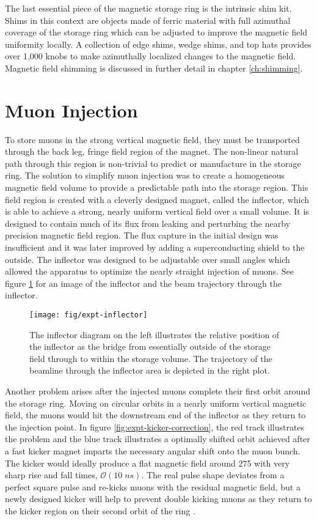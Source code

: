 The last essential piece of the magnetic storage ring is the intrinsic shim kit.  Shims in this context are objects made of ferric material with full azimuthal coverage of the storage ring which can be adjusted to improve the magnetic field uniformity locally. A collection of edge shims, wedge shims, and top hats provides over 1,000 knobs to make azimuthally localized changes to the magnetic field.
Magnetic field shimming is discussed in further detail in chapter \ref{ch:shimming}.

\section{Muon Injection} \label{sec:muon-injection}
To store muons in the strong vertical magnetic field, they must be transported through the back leg, fringe field region of the magnet.  The non-linear natural path through this region is non-trivial to predict or manufacture in the storage ring.  The solution to simplify muon injection was to create a homogeneous magnetic field volume to provide a predictable path into the storage region. This field region is created with a cleverly designed magnet, called the inflector, which is able to achieve a strong, nearly uniform vertical field over a small volume.  It is designed to contain much of its flux from leaking and perturbing the nearby precision magnetic field region.  The flux capture in the initial design was insufficient and it was later improved by adding a superconducting shield to the outside.  The inflector was designed to be adjustable over small angles which allowed the apparatus to optimize the nearly straight injection of muons. See figure \ref{fig:expt-inflector} for an image of the inflector and the beam trajectory through the inflector. \cite{e989-tdr, e821-prd}

\begin{figure}
\label{fig:expt-inflector}
\texttt{[image: fig/expt-inflector]}
\caption{The inflector diagram on the left illustrates the relative position of the inflector as the bridge from essentially outside of the storage field through to within the storage volume.  The trajectory of the beamline through the inflector area is depicted in the right plot.}
\end{figure}

Another problem arises after the injected muons complete their first orbit around the storage ring.  Moving on circular orbits in a nearly uniform vertical magnetic field, the muons would hit the downstream end of the inflector as they return to the injection point.  In figure \ref{fig:expt-kicker-correction}, the red track illustrates the problem and the blue track illustrates a optimally shifted orbit achieved after a fast kicker magnet imparts the necessary angular shift onto the muon bunch.  The kicker would ideally produce a flat magnetic field around \SI{275}{\gauss} with very sharp rise and fall times, $\mathcal{O}(10\;ns)$.  The real pulse shape deviates from a perfect square pulse and re-kicks muons with the residual magnetic field, but a newly designed kicker will help to prevent double kicking muons as they return to the kicker region on their second orbit of the ring \cite{e989-tdr}.  

